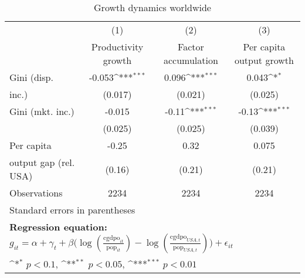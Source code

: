 \begin{table}[htbp]\centering
\def\sym#1{\ifmmode^{#1}\else\(^{#1}\)\fi}
\caption{Growth dynamics worldwide}
\begin{tabular}{l*{3}{c}}
\hline\hline
                &\multicolumn{1}{c}{(1)}&\multicolumn{1}{c}{(2)}&\multicolumn{1}{c}{(3)}\\
                &\multicolumn{1}{c}{Productivity growth}&\multicolumn{1}{c}{Factor accumulation}&\multicolumn{1}{c}{Per capita output growth}\\
\hline
Gini (disp.     &   -0.053\sym{***}&    0.096\sym{***}&    0.043\sym{*}  \\
inc.)           &  (0.017)         &  (0.021)         &  (0.025)         \\
[1em]
Gini (mkt. inc.)&   -0.015         &    -0.11\sym{***}&    -0.13\sym{***}\\
                &  (0.025)         &  (0.025)         &  (0.039)         \\
[1em]
Per capita      &    -0.25         &     0.32         &    0.075         \\
output gap (rel. USA)&   (0.16)         &   (0.21)         &   (0.21)         \\
\hline
Observations    &     2234         &     2234         &     2234         \\
\hline\hline
\multicolumn{4}{l}{\footnotesize Standard errors in parentheses}\\
\multicolumn{4}{l}{\footnotesize \textbf{Regression equation:} \(g_{it} = \alpha + \gamma_t + \beta \big(\log (\frac{\textrm{cgdpo}_{it}}{\textrm{pop}_{it}} ) - \log (\frac{\textrm{cgdpo}_{USA,t}}{\textrm{pop}_{USA,t}}  ) \big) + \epsilon_{it}\)}\\
\multicolumn{4}{l}{\footnotesize \sym{*} \(p<0.1\), \sym{**} \(p<0.05\), \sym{***} \(p<0.01\)}\\
\end{tabular}
\end{table}

